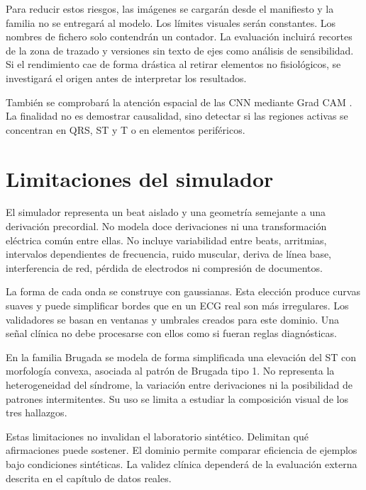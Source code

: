 Para reducir estos riesgos, las imágenes se cargarán desde el manifiesto y la familia no se entregará al modelo. Los límites visuales serán constantes. Los nombres de fichero solo contendrán un contador. La evaluación incluirá recortes de la zona de trazado y versiones sin texto de ejes como análisis de sensibilidad. Si el rendimiento cae de forma drástica al retirar elementos no fisiológicos, se investigará el origen antes de interpretar los resultados.

También se comprobará la atención espacial de las CNN mediante Grad CAM \cite{selvaraju2017}. La finalidad no es demostrar causalidad, sino detectar si las regiones activas se concentran en QRS, ST y T o en elementos periféricos.

\section{Limitaciones del simulador}

El simulador representa un beat aislado y una geometría semejante a una derivación precordial. No modela doce derivaciones ni una transformación eléctrica común entre ellas. No incluye variabilidad entre beats, arritmias, intervalos dependientes de frecuencia, ruido muscular, deriva de línea base, interferencia de red, pérdida de electrodos ni compresión de documentos.

La forma de cada onda se construye con gaussianas. Esta elección produce curvas suaves y puede simplificar bordes que en un ECG real son más irregulares. Los validadores se basan en ventanas y umbrales creados para este dominio. Una señal clínica no debe procesarse con ellos como si fueran reglas diagnósticas.

En la familia Brugada se modela de forma simplificada una elevación del ST con morfología convexa, asociada al patrón de Brugada tipo 1. No representa la heterogeneidad del síndrome, la variación entre derivaciones ni la posibilidad de patrones intermitentes. Su uso se limita a estudiar la composición visual de los tres hallazgos.

Estas limitaciones no invalidan el laboratorio sintético. Delimitan qué afirmaciones puede sostener. El dominio permite comparar eficiencia de ejemplos bajo condiciones sintéticas. La validez clínica dependerá de la evaluación externa descrita en el capítulo de datos reales.
